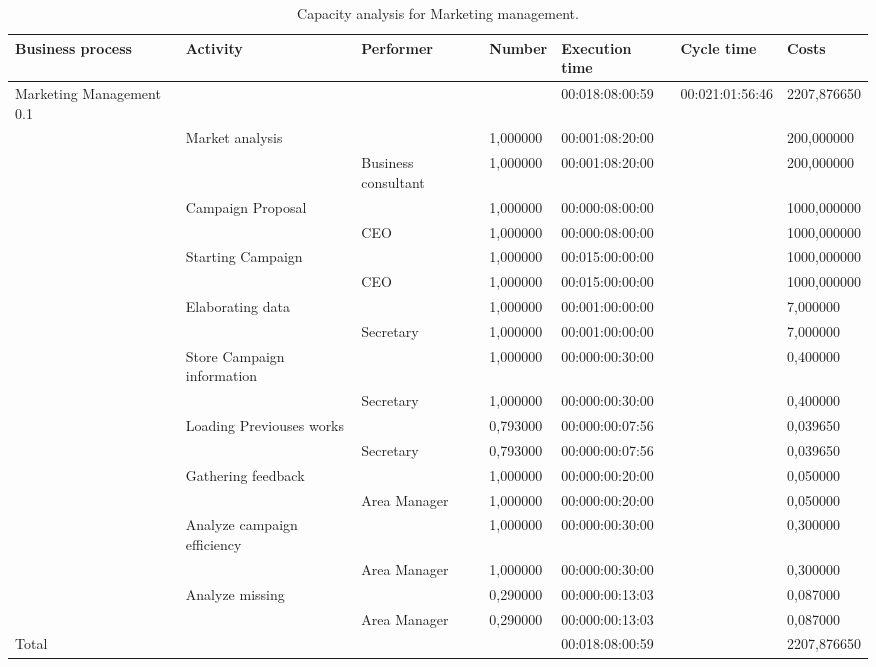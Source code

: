 \begin{landscape}
\centering
\begin{table}
{\tiny
\begin{tabular}{|l|l|l|l|l|l|l|}
Business process&Activity&Performer&Number&Execution time&Cycle time&Costs\\
\hline
Marketing Management 0.1&&&&00:018:08:00:59&00:021:01:56:46&2207,876650\\
\hline
&Market analysis &&1,000000&00:001:08:20:00&&200,000000\\
\hline
&&Business consultant &1,000000&00:001:08:20:00&&200,000000\\
\hline
&Campaign Proposal &&1,000000&00:000:08:00:00&&1000,000000\\
\hline
&&CEO &1,000000&00:000:08:00:00&&1000,000000\\
\hline
&Starting Campaign &&1,000000&00:015:00:00:00&&1000,000000\\
\hline
&&CEO &1,000000&00:015:00:00:00&&1000,000000\\
\hline
&Elaborating data &&1,000000&00:001:00:00:00&&7,000000\\
\hline
&&Secretary &1,000000&00:001:00:00:00&&7,000000\\
\hline
&Store Campaign information &&1,000000&00:000:00:30:00&&0,400000\\
\hline
&&Secretary &1,000000&00:000:00:30:00&&0,400000\\
\hline
&Loading Previouses works &&0,793000&00:000:00:07:56&&0,039650\\
\hline
&&Secretary &0,793000&00:000:00:07:56&&0,039650\\
\hline
&Gathering feedback &&1,000000&00:000:00:20:00&&0,050000\\
\hline
&&Area Manager &1,000000&00:000:00:20:00&&0,050000\\
\hline
&Analyze campaign efficiency &&1,000000&00:000:00:30:00&&0,300000\\
\hline
&&Area Manager &1,000000&00:000:00:30:00&&0,300000\\
\hline
&Analyze missing &&0,290000&00:000:00:13:03&&0,087000\\
\hline
&&Area Manager &0,290000&00:000:00:13:03&&0,087000\\
\hline
Total&&&&00:018:08:00:59&&2207,876650\\
\end{tabular}
}
\caption{Capacity analysis for Marketing management.}
\end{table}
\end{landscape}
%

